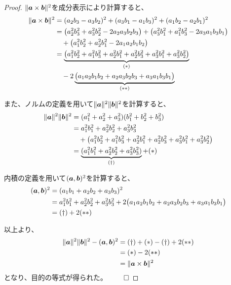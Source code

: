 \documentclass[../../../topic_linear-algebra]{subfiles}
\begin{document}
\begin{proof}
  $\| \vb*{a} \times \vb*{b} \|^2$を成分表示により計算すると、
  \begin{align*}
    \lVert \vb*{a}\times \vb*{b}\rVert^2
    &=(a_2b_3-a_3b_2)^2+(a_3b_1-a_1b_3)^2+(a_1b_2-a_2b_1)^2\\
    &=\bigl(a_2^2b_3^2+a_3^2b_2^2-2a_2a_3b_2b_3\bigr)
     +\bigl(a_3^2b_1^2+a_1^2b_3^2-2a_3a_1b_3b_1\bigr)\\
    &\quad
     +\bigl(a_1^2b_2^2+a_2^2b_1^2-2a_1a_2b_1b_2\bigr)\\
    &=\underbrace{\bigl(
    a_1^2b_2^2+a_1^2b_3^2+a_2^2b_1^2+a_2^2b_3^2+a_3^2b_1^2+a_3^2b_2^2
    \bigr)}_{(\ast)}\\
    &\quad-2\underbrace{\bigl(
    a_1a_2b_1b_2+a_2a_3b_2b_3+a_3a_1b_3b_1
    \bigr)}_{(\ast\ast)}
  \end{align*}

  また、ノルムの定義を用いて$\| \vb*{a}\|^2\| \vb*{b}\|^2$を計算すると、
  \begin{align*}
    \lVert \vb*{a}\rVert^2\lVert \vb*{b}\rVert^2
    &=(a_1^2+a_2^2+a_3^2)(b_1^2+b_2^2+b_3^2)\\
    &=a_1^2b_1^2+a_2^2b_2^2+a_3^2b_3^2 \\
    &\quad+\bigl(
    a_1^2b_2^2+a_1^2b_3^2+a_2^2b_1^2+a_2^2b_3^2+a_3^2b_1^2+a_3^2b_2^2
    \bigr)\\
    &=\underbrace{(a_1^2b_1^2+a_2^2b_2^2+a_3^2b_3^2)}_{(\dagger)}+(\ast)
  \end{align*}
  
  内積の定義を用いて$(\vb*{a}, \vb*{b})^2$を計算すると、
  \begin{align*}
    (\vb*{a},  \vb*{b})^2
    &=(a_1b_1+a_2b_2+a_3b_3)^2\\
    &=a_1^2b_1^2+a_2^2b_2^2+a_3^2b_3^2
    +2\bigl(a_1a_2b_1b_2+a_2a_3b_2b_3+a_3a_1b_3b_1\bigr)\\
    &=(\dagger)+2(\ast\ast)
  \end{align*}
  
  以上より、
  \begin{align*}
    \| \vb*{a} \|^2 \| \vb*{b} \|^2 - ( \vb*{a} ,\vb*{b} )^2
    &= (\dagger) + (\ast) - (\dagger)+2(\ast\ast) \\
    &= (\ast) - 2(\ast\ast) \\
    &= \| \vb*{a} \times \vb*{b} \|^2
  \end{align*}
  となり、目的の等式が得られた。 $\qed$
\end{proof}

\br
\end{document}

